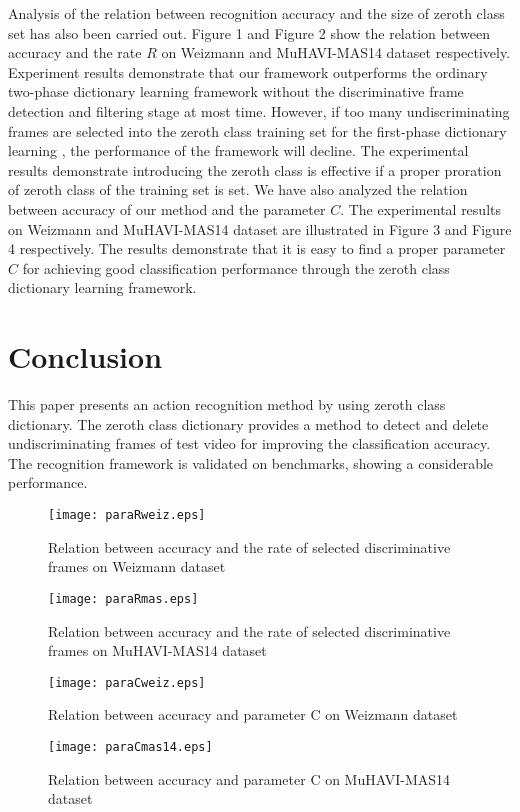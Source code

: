\documentclass{article}
\begin{document}
 Analysis of the relation between recognition accuracy and  the size of zeroth class set has also been carried out.
  Figure 1 and Figure 2 show the relation between accuracy and the rate $R$  on  Weizmann  and MuHAVI-MAS14 dataset respectively.
 Experiment results demonstrate that our framework outperforms the ordinary two-phase dictionary learning framework without the discriminative frame detection and filtering stage at most time.
However, if too many undiscriminating frames are selected into the zeroth class training set for the first-phase dictionary learning , the performance of the framework  will decline.
The experimental results  demonstrate introducing the zeroth class is  effective  if  a proper proration of zeroth class of the training set is set.
We have also analyzed  the relation between accuracy of our method and the parameter $C$.
The experimental results on Weizmann and  MuHAVI-MAS14 dataset are illustrated in Figure 3 and Figure 4 respectively.
The results demonstrate that it is easy to find a proper parameter $C$ for achieving good classification performance through the zeroth class dictionary learning framework.



\section{Conclusion}
This paper presents an action recognition method by using zeroth class dictionary.
The zeroth class dictionary provides a method to detect and delete undiscriminating
frames of test video for improving the classification accuracy.
The recognition framework is validated on benchmarks, showing a considerable performance.


\begin{figure}[htbp]
\centering
\texttt{[image: paraRweiz.eps]}
\caption{Relation between accuracy  and the rate of selected discriminative frames on Weizmann dataset}
\label{Fig3}
\end{figure}


\begin{figure}[htbp]
\centering
\texttt{[image: paraRmas.eps]}
\caption{Relation between accuracy  and the rate of selected discriminative frames on MuHAVI-MAS14 dataset }
\label{Fig3}
\end{figure}





\begin{figure}[htbp]
\centering
\texttt{[image: paraCweiz.eps]}
\caption{Relation between accuracy  and parameter C on Weizmann dataset}
\label{Fig3}
\end{figure}




\begin{figure}[htbp]
\centering
\texttt{[image: paraCmas14.eps]}
\caption{Relation between accuracy and parameter C on MuHAVI-MAS14 dataset}
\label{Fig3}
\end{figure}













{


}
\end{document}
